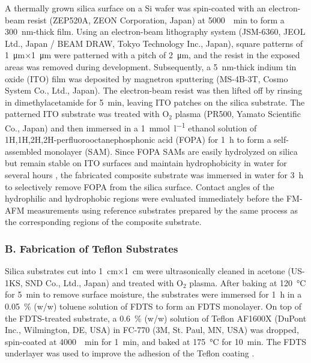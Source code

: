 \documentclass[journal=jacsat,manuscript=article]{achemso}
\providecommand{\DIFadd}[1]{{\protect\color{blue}#1}} %
\providecommand{\DIFaddbegin}{} %
\providecommand{\DIFaddend}{} %
\newcommand{\DIFaddincludegraphics}[2][]{{\color{blue}\DIFOincludegraphics[#1]{#2}}} %
\DeclareRobustCommand{\DIFaddbegin}{\DIFOaddbegin \let\includegraphics\DIFaddincludegraphics} %
\DeclareRobustCommand{\DIFaddend}{\DIFOaddend \let\includegraphics\DIFOincludegraphics} %
\begin{document}
A thermally grown silica surface on a Si wafer was spin-coated with an electron-beam resist (ZEP520A, ZEON Corporation, Japan) at \SI{5000}{\per\minute} to form a \SI{300}{\nano\metre}-thick film. Using an electron-beam lithography system (JSM-6360, JEOL Ltd., Japan / BEAM DRAW, Tokyo Technology Inc., Japan), square patterns of \SI{1}{\micro\metre}\(\times\)\SI{1}{\micro\metre} were patterned with a pitch of \SI{2}{\micro\metre}, and the resist in the exposed areas was removed during development. Subsequently, a \SI{5}{\nano\metre}-thick indium tin oxide (ITO) film was deposited by magnetron sputtering (MS-4B-3T, Cosmo System Co., Ltd., Japan). The electron-beam resist was then lifted off by rinsing in dimethylacetamide for \SI{5}{\minute}, leaving ITO patches on the silica substrate. The patterned ITO substrate was treated with \(\mathrm{O}_2\) plasma (PR500, Yamato Scientific Co., Japan) and then immersed in a \SI{1}{\milli\mole\per\litre} ethanol solution of 1H,1H,2H,2H-perfluorooctanephosphonic acid (FOPA) for \SI{1}{\hour} to form a self-assembled monolayer (SAM). Since FOPA SAMs are easily hydrolyzed on silica but remain stable on ITO surfaces and maintain hydrophobicity in water for several hours \cite{Thissen2012-xt, Jo2011-nw}, the fabricated composite substrate was immersed in water for \SI{3}{\hour} to selectively remove FOPA from the silica surface. \DIFaddbegin \DIFadd{Contact angles of the hydrophilic and hydrophobic regions were evaluated immediately before the FM-AFM measurements using reference substrates prepared by the same process as the corresponding regions of the composite substrate.
}\DIFaddend 

\subsubsection{B. Fabrication of Teflon Substrates}

Silica substrates cut into \SI{1}{\centi\metre}\(\times\)\SI{1}{\centi\metre} were ultrasonically cleaned in acetone (US-1KS, SND Co., Ltd., Japan) and treated with \(\mathrm{O}_2\) plasma. After baking at \SI{120}{\degreeCelsius} for \SI{5}{\minute} to remove surface moisture, the substrates were immersed for \SI{1}{\hour} in a \SI{0.05}{\percent} (w/w) toluene solution of FDTS to form an FDTS monolayer. On top of the FDTS-treated substrate, a \SI{0.6}{\percent} (w/w) solution of Teflon AF1600X (DuPont Inc., Wilmington, DE, USA) in FC-770 (3M, St. Paul, MN, USA) was dropped, spin-coated at \SI{4000}{\per\minute} for \SI{1}{\minute}, and baked at \SI{175}{\degreeCelsius} for \SI{10}{\minute}. The FDTS underlayer was used to improve the adhesion of the Teflon coating \cite{Makohliso1998-av}.
\end{document}
